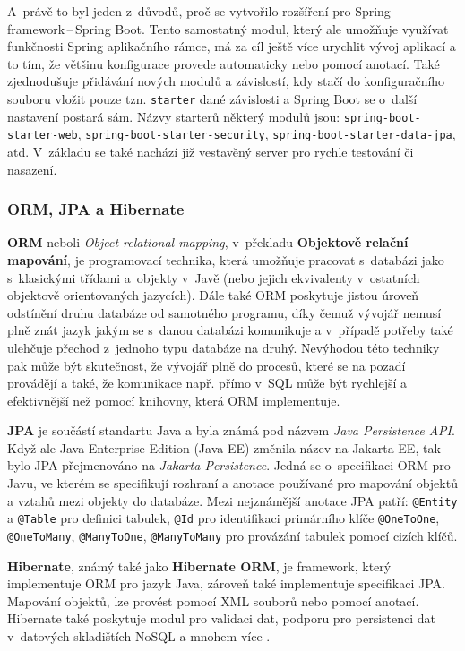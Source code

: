 A~právě to byl jeden z~důvodů, proč se vytvořilo rozšíření pro Spring framework\,--\,Spring Boot. Tento samostatný modul, který ale umožňuje využívat funkčnosti Spring aplikačního rámce, má za cíl ještě více urychlit vývoj aplikací a to tím, že většinu konfigurace provede automaticky nebo pomocí anotací. Také zjednodušuje přidávání nových modulů a závislostí, kdy stačí do konfiguračního souboru vložit pouze tzn. \texttt{starter} dané závislosti a Spring Boot se o~další nastavení postará sám. Názvy starterů některý modulů jsou: \texttt{spring-boot-starter-web}, \texttt{spring-boot-starter-security}, \texttt{spring-boot-starter-da\-ta-jpa}, atd. V~základu se také nachází již vestavěný server pro rychle testování či nasazení.


\subsubsection* {ORM, JPA a Hibernate}

\textbf{ORM} neboli \textit{Object-relational mapping}, v~překladu \textbf{Objektově relační mapování}, je programovací technika, která umožňuje pracovat s~databázi jako s~klasickými třídami a~objekty v~Javě (nebo jejich ekvivalenty v~ostatních objektově orientovaných jazycích). Dále také ORM poskytuje jistou úroveň odstínění druhu databáze od samotného programu, díky čemuž vývojář nemusí plně znát jazyk jakým se s~danou databázi komunikuje a v~případě potřeby také ulehčuje přechod z~jednoho typu databáze na druhý. Nevýhodou této techniky pak může být skutečnost, že vývojář plně  do procesů, které se na pozadí provádějí a také, že komunikace např. přímo v~SQL může být rychlejší a efektivnější než pomocí knihovny, která ORM implementuje.

\textbf{JPA} je součástí standartu Java a byla známá pod názvem \textit{Java Persistence API}. Když ale Java Enterprise Edition (Java EE) změnila název na Jakarta EE, tak bylo JPA přejmenováno na \textit{Jakarta Persistence}. Jedná se o~specifikaci ORM pro Javu, ve kterém se specifikují rozhraní a anotace používané pro mapování objektů a vztahů mezi objekty do databáze. Mezi nejznámější anotace JPA patří: \texttt{@Entity} a \texttt{@Table} pro definici tabulek, \texttt{@Id} pro identifikaci primárního klíče \texttt{@OneToOne}, \texttt{@OneToMany}, \texttt{@ManyToOne}, \texttt{@ManyToMany} pro provázání tabulek pomocí cizích klíčů.

\textbf{Hibernate}, známý také jako \textbf{Hibernate ORM}, je framework, který implementuje ORM pro jazyk Java, zároveň také implementuje specifikaci JPA. Mapování objektů, lze provést pomocí XML souborů nebo pomocí anotací. Hibernate také poskytuje modul pro validaci dat, podporu pro persistenci dat v~datových skladištích NoSQL a mnohem více  \cite{Hibernate}.


